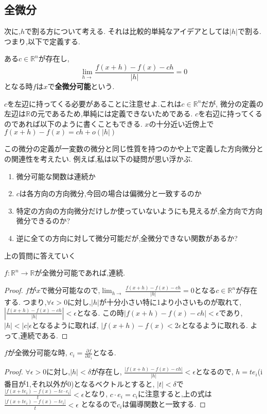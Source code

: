 \documentclass{ujarticle}
\begin{document}
\subsection{全微分}
次に,$h$で割る方について考える.
それは比較的単純なアイデアとしては$|h|$で割る.
つまり,以下で定義する.
\begin{dfn}
ある$c \in \mathbb{R}^n$が存在し,
\begin{equation*}
 \lim_{h \to }\frac{f(x+h) - f(x) - ch}{|h|}  = 0
\end{equation*}
となる時$f$は$x$で\textbf{全微分可能}という.
\end{dfn}
$c$を左辺に持ってくる必要があることに注意せよ.これは$c \in \mathbb{R}^n$だが,
微分の定義の左辺は$\mathbb{R}$の元であるため,単純には定義できないためである.
$c$を右辺に持ってくるのであれば以下のように書くこともできる.
$x$の十分近い近傍上で$f(x+h)-f(x) = ch + o(|h|)$

この微分の定義が一変数の微分と同じ性質を持つのかや上で定義した方向微分との関連性を考えたい.
例えば,私は以下の疑問が思い浮かぶ.

\begin{enumerate}
  \item 微分可能な関数は連続か
  \item $c$は各方向の方向微分,今回の場合は偏微分と一致するのか
  \item 特定の方向の方向微分だけしか使っていないようにも見えるが,全方向で方向微分できるのか?
  \item 逆に全ての方向に対して微分可能だが,全微分できない関数があるか?
\end{enumerate}
上の質問に答えていく

\begin{lem}
$f: \mathbb{R}^n \to \mathbb{R}$が全微分可能であれば,連続.
\end{lem}
\begin{proof}
$f$が$x$で微分可能なので,$\lim_{h \to }\frac{f(x+h) - f(x) - ch}{|h|}  = 0$となる$c \in \mathbb{R}^n$が存在する.
つまり,$\forall \epsilon > 0$に対し,$|h|$が十分小さい特に1より小さいものが取れて,
$|\frac{f(x+h) - f(x) - ch}{|h|}| < \epsilon$となる.
この時$|f(x+h) - f(x) - ch| < \epsilon$であり,$|h| < |c|\epsilon$となるように取れば,
$|f(x+h) - f(x) < 2\epsilon$となるように取れる.
よって,連続である.
\end{proof}


\begin{prop}
  $f$が全微分可能な時,
  $c_i = \frac{\partial f}{\partial x_i}$となる.
\end{prop}
\begin{proof}
$\forall \epsilon >0$に対し,$|h| < \delta$が存在し,
$\frac{|f(x+h)-f(x) - ch|}{|h|} < \epsilon$となるので,
$h = te_i$(i番目が1,それ以外が0)となるベクトルとすると,
$|t| < \delta$で$\frac{|f(x+te_i)-f(x) - tc\cdot e_i|}{t} < \epsilon$となり,
$c \cdot e_i = c_i$に注意すると,上の式は$\frac{|f(x+te_i)-f(x) - tc_i|}{t} < \epsilon$
となるので$c_i$は偏導関数と一致する.
\end{proof}
\end{document}

